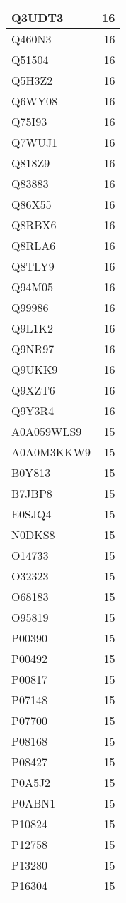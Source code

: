 \documentclass[
]{book}
\theoremstyle{definition}
\theoremstyle{definition}
\theoremstyle{definition}
\theoremstyle{definition}
\theoremstyle{remark}
\begin{document}
\begin{table}
\begin{tabular}{l|r}
\hline
Q3UDT3 & 16\\
\hline
Q460N3 & 16\\
\hline
Q51504 & 16\\
\hline
Q5H3Z2 & 16\\
\hline
Q6WY08 & 16\\
\hline
Q75I93 & 16\\
\hline
Q7WUJ1 & 16\\
\hline
Q818Z9 & 16\\
\hline
Q83883 & 16\\
\hline
Q86X55 & 16\\
\hline
Q8RBX6 & 16\\
\hline
Q8RLA6 & 16\\
\hline
Q8TLY9 & 16\\
\hline
Q94M05 & 16\\
\hline
Q99986 & 16\\
\hline
Q9L1K2 & 16\\
\hline
Q9NR97 & 16\\
\hline
Q9UKK9 & 16\\
\hline
Q9XZT6 & 16\\
\hline
Q9Y3R4 & 16\\
\hline
A0A059WLS9 & 15\\
\hline
A0A0M3KKW9 & 15\\
\hline
B0Y813 & 15\\
\hline
B7JBP8 & 15\\
\hline
E0SJQ4 & 15\\
\hline
N0DKS8 & 15\\
\hline
O14733 & 15\\
\hline
O32323 & 15\\
\hline
O68183 & 15\\
\hline
O95819 & 15\\
\hline
P00390 & 15\\
\hline
P00492 & 15\\
\hline
P00817 & 15\\
\hline
P07148 & 15\\
\hline
P07700 & 15\\
\hline
P08168 & 15\\
\hline
P08427 & 15\\
\hline
P0A5J2 & 15\\
\hline
P0ABN1 & 15\\
\hline
P10824 & 15\\
\hline
P12758 & 15\\
\hline
P13280 & 15\\
\hline
P16304 & 15\\

\end{tabular}
\end{table}
\end{document}
